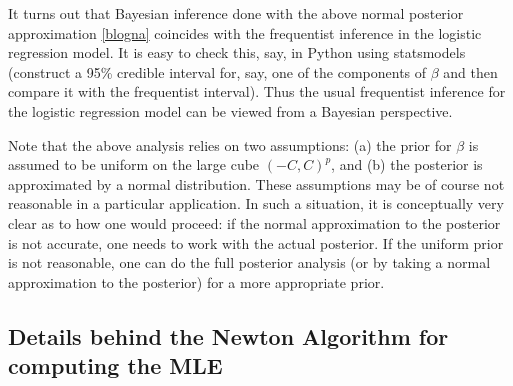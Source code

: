 \documentclass{scrartcl}
\begin{document}
It turns out that Bayesian inference done with the above normal
posterior approximation \eqref{blogna} coincides with the frequentist
inference in 
the logistic regression model. It is easy to check this, say, in
Python using statsmodels
(construct a 95\% credible interval for, say, one of the components of
$\beta$ and then compare it with the frequentist interval). Thus the
usual frequentist inference for the logistic regression model can be
viewed from a Bayesian perspective.

Note that the above analysis
relies on two assumptions: (a) the prior for $\beta$ is assumed to be
uniform on the large cube $(-C, C)^p$, and (b) the posterior is
approximated by a normal distribution. These assumptions may be of
course not reasonable in a particular application. In such a
situation, it is conceptually very clear as to how one would proceed: 
if the normal approximation to the posterior is not accurate, one
needs to work with the actual posterior. If the uniform prior is not
reasonable, one can do the full posterior analysis (or by taking a
normal approximation to the posterior) for a more appropriate prior. 

\subsection{Details behind the Newton Algorithm for computing the MLE}
\end{document}
